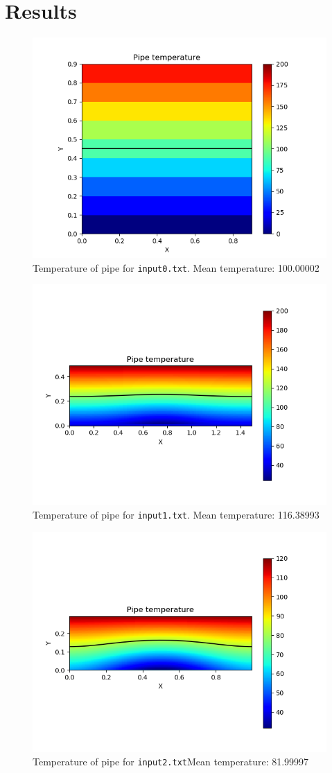 \documentclass[12pt]{article}
\begin{document}
\section{Results}
\begin{figure}[h!]
    \centering
    \includegraphics[width=0.5\linewidth]{temperature0.png} 
    \caption{\label{f:in0} Temperature of pipe for \texttt{input0.txt}. Mean temperature: 100.00002}
\end{figure}

\begin{figure}[h!]
    \centering
    \includegraphics[width=0.7\linewidth]{temperature1.png} 
    \caption{\label{f:in1} Temperature of pipe for \texttt{input1.txt}. Mean temperature: 116.38993}
\end{figure}

\begin{figure}[h!]
    \centering
    \includegraphics[width=0.7\linewidth]{temperature2.png} 
    \caption{\label{f:in2} Temperature of pipe for \texttt{input2.txt}Mean temperature: 81.99997}
\end{figure}
\end{document}
